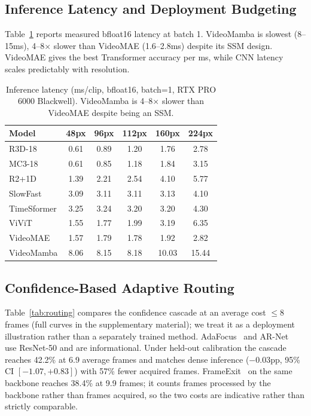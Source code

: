 \documentclass[a4paper, 10pt, conference]{ieeeconf}
\newcommand{\tabtight}{\setlength{\tabcolsep}{3.5pt}\renewcommand{\arraystretch}{1.10}}
\begin{document}
\subsection{Inference Latency and Deployment Budgeting}
\label{sec:results_latency}

Table~\ref{tab:latency} reports measured bfloat16 latency at batch 1. VideoMamba is slowest (8--15ms), 4--8$\times$ slower than VideoMAE (1.6--2.8ms) despite its SSM design. VideoMAE gives the best Transformer accuracy per ms, while CNN latency scales predictably with resolution.

\begin{table}[t]
\centering
\caption{Inference latency (ms/clip, bfloat16, batch=1, RTX PRO 6000 Blackwell). VideoMamba is 4--8$\times$ slower than VideoMAE despite being an SSM.}
\label{tab:latency}
\scriptsize\tabtight
\begin{tabular}{l ccccc}
\toprule
Model & 48px & 96px & 112px & 160px & 224px \\
\midrule
R3D-18      & 0.61 & 0.89 & 1.20 & 1.76 & 2.78 \\
MC3-18      & 0.61 & 0.85 & 1.18 & 1.84 & 3.15 \\
R2+1D       & 1.39 & 2.21 & 2.54 & 4.10 & 5.77 \\
SlowFast    & 3.09 & 3.11 & 3.11 & 3.13 & 4.10 \\
\midrule
TimeSformer & 3.25 & 3.24 & 3.20 & 3.20 & 4.30 \\
ViViT       & 1.55 & 1.77 & 1.99 & 3.19 & 6.35 \\
VideoMAE    & 1.57 & 1.79 & 1.78 & 1.92 & 2.82 \\
VideoMamba  & 8.06 & 8.15 & 8.18 & 10.03 & 15.44 \\
\bottomrule
\end{tabular}
\end{table}

\subsection{Confidence-Based Adaptive Routing}
\label{sec:results_routing}

Table~\ref{tab:routing} compares the confidence cascade at an average cost $\leq8$ frames (full curves in the supplementary material); we treat it as a deployment illustration rather than a separately trained method. AdaFocus~\cite{wang2021adafocus} and AR-Net~\cite{meng2020arnet} use ResNet-50 and are informational. Under held-out calibration the cascade reaches 42.2\% at 6.9 average frames and matches dense inference ($-0.03$pp, 95\% CI $[-1.07,+0.83]$) with 57\% fewer acquired frames. FrameExit~\cite{ghodrati2021frameexit} on the same backbone reaches 38.4\% at 9.9 frames; it counts frames processed by the backbone rather than frames acquired, so the two costs are indicative rather than strictly comparable.
\end{document}
